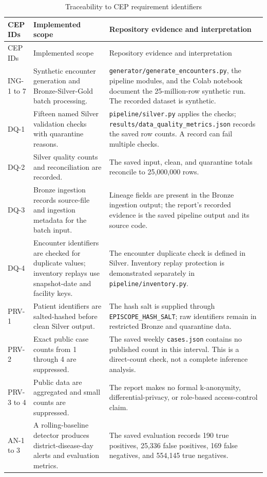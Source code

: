 \documentclass[conference]{IEEEtran}
\begin{document}
\small
\begin{longtable}{p{1.7cm}p{5.6cm}p{8.3cm}}
\caption{Traceability to CEP requirement identifiers}\\
\toprule CEP IDs & Implemented scope & Repository evidence and interpretation \\
\midrule\endfirsthead
\toprule CEP IDs & Implemented scope & Repository evidence and interpretation \\
\midrule\endhead
ING-1 to 7 & Synthetic encounter generation and Bronze-Silver-Gold batch processing. & \texttt{generator/generate\_encounters.py}, the pipeline modules, and the Colab notebook document the 25-million-row synthetic run. The recorded dataset is synthetic. \\
DQ-1 & Fifteen named Silver validation checks with quarantine reasons. & \texttt{pipeline/silver.py} applies the checks; \texttt{results/data\_quality\_metrics.json} records the saved row counts. A record can fail multiple checks. \\
DQ-2 & Silver quality counts and reconciliation are recorded. & The saved input, clean, and quarantine totals reconcile to 25,000,000 rows. \\
DQ-3 & Bronze ingestion records source-file and ingestion metadata for the batch input. & Lineage fields are present in the Bronze ingestion output; the report's recorded evidence is the saved pipeline output and its source code. \\
DQ-4 & Encounter identifiers are checked for duplicate values; inventory replays use snapshot-date and facility keys. & The encounter duplicate check is defined in Silver. Inventory replay protection is demonstrated separately in \texttt{pipeline/inventory.py}. \\
PRV-1 & Patient identifiers are salted-hashed before clean Silver output. & The hash salt is supplied through \texttt{EPISCOPE\_HASH\_SALT}; raw identifiers remain in restricted Bronze and quarantine data. \\
PRV-2 & Exact public case counts from 1 through 4 are suppressed. & The saved weekly \texttt{cases.json} contains no published count in this interval. This is a direct-count check, not a complete inference analysis. \\
PRV-3 to 4 & Public data are aggregated and small counts are suppressed. & The report makes no formal k-anonymity, differential-privacy, or role-based access-control claim. \\
AN-1 to 3 & A rolling-baseline detector produces district-disease-day alerts and evaluation metrics. & The saved evaluation records 190 true positives, 25,336 false positives, 169 false negatives, and 554,145 true negatives. \\

\end{longtable}
\end{document}
